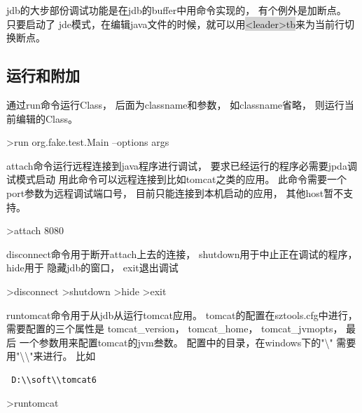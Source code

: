 \documentclass[oneside,openany]{book}
\begin{document}
    jdb的大步部份调试功能是在jdb的buffer中用命令实现的， 有个例外是加断点。 只要启动了
    jde模式，在编辑java文件的时候，就可以用\colorbox{lightgray}{<leader>tb}来为当前行切换断点。

  \subsection{运行和附加}
    
    通过run命令运行Class， 后面为classname和参数， 如classname省略， 则运行当前编辑的Class。
    \begin{mdframed}[style=SmallFrame]
    \begin{flushleft}
    >run org.fake.test.Main --options args
    \end{flushleft}
    \end{mdframed}
    \vspace{4mm}

    attach命令运行远程连接到java程序进行调试， 要求已经运行的程序必需要jpda调试模式启动
    用此命令可以远程连接到比如tomcat之类的应用。 此命令需要一个port参数为远程调试端口号， 
    目前只能连接到本机启动的应用， 其他host暂不支持。
    \begin{mdframed}[style=SmallFrame]
    \begin{flushleft}
    >attach 8080              
    \end{flushleft}
    \end{mdframed}
    \vspace{4mm}

    disconnect命令用于断开attach上去的连接， shutdown用于中止正在调试的程序， hide用于
    隐藏jdb的窗口， exit退出调试 
    \begin{mdframed}[style=SmallFrame]
     \begin{flushleft}
    >disconnect\newline
    >shutdown\newline
    >hide\newline
    >exit                      
    \end{flushleft}
    \end{mdframed}
    \vspace{5mm}

    runtomcat命令用于从jdb从运行tomcat应用。 tomcat的配置在sztools.cfg中进行， 
    需要配置的三个属性是 tomcat\_version， tomcat\_home， tomcat\_jvmopts， 最后
    一个参数用来配置tomcat的jvm叁数。 配置中的目录，在windows下的"\textbackslash"
    需要用"\textbackslash\textbackslash"来进行。 比如
    \begin{verbatim} D:\\soft\\tomcat6 \end{verbatim}
    \begin{mdframed}[style=SmallFrame]
     \begin{flushleft}
      >runtomcat
     \end{flushleft}
    \end{mdframed}
\end{document}
